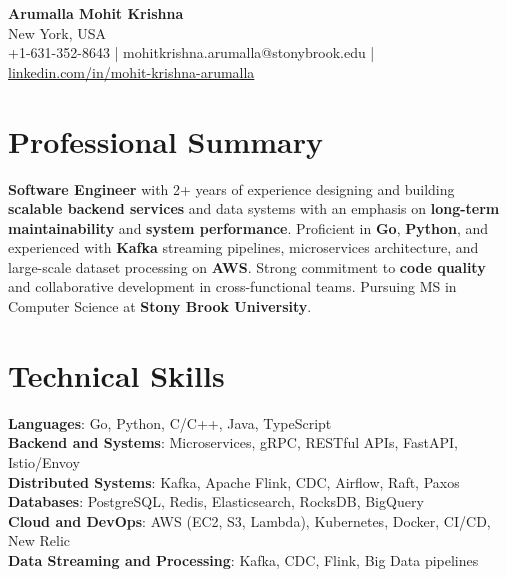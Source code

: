 \documentclass[letterpaper,11pt]{article}
\begin{document}
\begin{center}
  {\Large \textbf{Arumalla Mohit Krishna}} \\
  New York, USA \\
  +1-631-352-8643 \enspace | \enspace mohitkrishna.arumalla@stonybrook.edu \enspace | \enspace \href{https://www.linkedin.com/in/mohit-krishna-arumalla}{linkedin.com/in/mohit-krishna-arumalla}
\end{center}

\section{Professional Summary}
  \begin{itemize}[leftmargin=0.15in, label={}]
    \small{\item{
     \textbf{Software Engineer} with 2+ years of experience designing and building \textbf{scalable backend services} and data systems with an emphasis on \textbf{long-term maintainability} and \textbf{system performance}. Proficient in \textbf{Go}, \textbf{Python}, and experienced with \textbf{Kafka} streaming pipelines, microservices architecture, and large-scale dataset processing on \textbf{AWS}. Strong commitment to \textbf{code quality} and collaborative development in cross-functional teams. Pursuing MS in Computer Science at \textbf{Stony Brook University}.
    }}
  \end{itemize}
\vspace{-16pt}

\section{Technical Skills}
 \begin{itemize}[leftmargin=0.15in, label={}]
    \small{\item{
     \textbf{Languages}: Go, Python, C/C++, Java, TypeScript \\
     \textbf{Backend and Systems}: Microservices, gRPC, RESTful APIs, FastAPI, Istio/Envoy \\
     \textbf{Distributed Systems}: Kafka, Apache Flink, CDC, Airflow, Raft, Paxos \\
     \textbf{Databases}: PostgreSQL, Redis, Elasticsearch, RocksDB, BigQuery \\
     \textbf{Cloud and DevOps}: AWS (EC2, S3, Lambda), Kubernetes, Docker, CI/CD, New Relic \\
     \textbf{Data Streaming and Processing}: Kafka, CDC, Flink, Big Data pipelines \\
    }}
 \end{itemize}
\vspace{-16pt}
\end{document}
